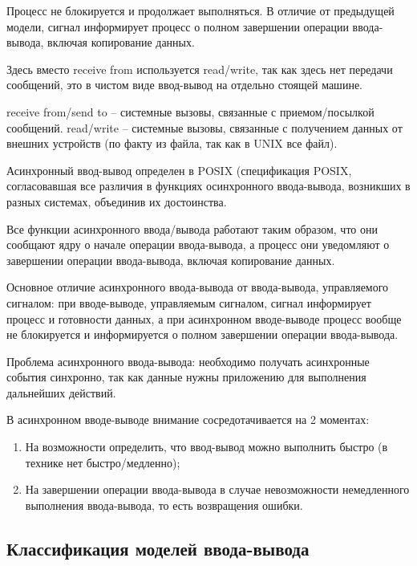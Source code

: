 Процесс не блокируется и продолжает выполняться. В отличие от предыдущей модели, сигнал информирует процесс о полном завершении операции ввода-вывода, включая копирование данных. 

Здесь вместо receive from используется read/write, так как здесь нет передачи сообщений, это в чистом виде ввод-вывод на отдельно стоящей машине. 

receive from/send to – системные вызовы, связанные с приемом/посылкой сообщений.
read/write – системные вызовы, связанные с получением данных от внешних устройств (по факту из файла, так как в UNIX все файл).

Асинхронный ввод-вывод определен в POSIX (спецификация POSIX, согласовавшая все различия в функциях осинхронного ввода-вывода, возникших в разных системах, объединив их достоинства.

Все функции асинхронного ввода/вывода работают таким образом, что они сообщают ядру о начале операции ввода-вывода, а процесс они уведомляют о завершении операции ввода-вывода, включая копирование данных.

Основное отличие асинхронного ввода-вывода от ввода-вывода, управляемого сигналом: при вводе-выводе, управляемым сигналом, сигнал информирует процесс и готовности данных, а при асинхронном вводе-выводе процесс вообще не блокируется и информируется о полном завершении операции ввода-вывода.

Проблема асинхронного ввода-вывода: необходимо получать асинхронные события синхронно, так как данные нужны приложению для выполнения дальнейших действий.

В асинхронном вводе-выводе внимание сосредотачивается на 2 моментах:
\begin{enumerate}
\item На возможности определить, что ввод-вывод можно выполнить быстро (в технике нет быстро/медленно);
\item На завершении операции ввода-вывода в случае невозможности немедленного выполнения ввода-вывода, то есть возвращения ошибки.
\end{enumerate}

\subsection{Классификация моделей ввода-вывода}

